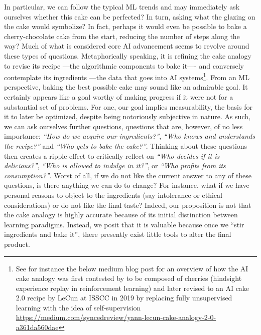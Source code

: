 \documentclass[manuscript,screen,authorversion,nonacm]{acmart}
\begin{document}
In particular, we can follow the typical ML trends and may immediately ask ourselves whether this cake can be perfected? In turn, asking what the glazing on the cake would symbolize? In fact, perhaps it would even be possible to bake a cherry-chocolate cake from the start, reducing the number of steps along the way? Much of what is considered core AI advancement seems to revolve around these types of questions. Metaphorically speaking, it is refining the cake analogy to revise its recipe ---the algorithmic components to bake it---- and conversely contemplate its ingredients ---the data that goes into AI systems\footnote{See for instance the below medium blog post for an overview of how the AI cake analogy was first contested by \citet{Andrychowicz2017hindsightrep} to be composed of cherries (hindsight experience replay in reinforcement learning) and later revised to an AI cake 2.0 recipe by LeCun at ISSCC in 2019 by replacing fully unsupervised learning with the idea of self-supervision \url{https://medium.com/syncedreview/yann-lecun-cake-analogy-2-0-a361da560dae}}. From an ML perspective, baking the best possible cake may sound like an admirable goal. It certainly appears like a goal worthy of making progress if it were not for a substantial set of problems. For one, our goal implies measurability, the basis for it to later be optimized, despite being notoriously subjective in nature. As such, we can ask ourselves further questions, questions that are, however, of no less importance: \emph{``How do we acquire our ingredients?''}, \emph{``Who knows and understands the recipe?''} and \emph{``Who gets to bake the cake?''}. Thinking about these questions then creates a ripple effect to critically reflect on \emph{``Who decides if it is delicious?''}, \emph{``Who is allowed to indulge in it?''}, or \emph{``Who profits from its consumption?''}. Worst of all, if we do not like the current answer to any of these questions, is there anything we can do to change? For instance, what if we have personal reasons to object to the ingredients (say intolerance or ethical considerations) or do not like the final taste? Indeed, our proposition is not that the cake analogy is highly accurate because of its initial distinction between learning paradigms. Instead, we posit that it is valuable because once we ``stir ingredients and bake it'', there presently exist little tools to alter the final product. \\
\end{document}
